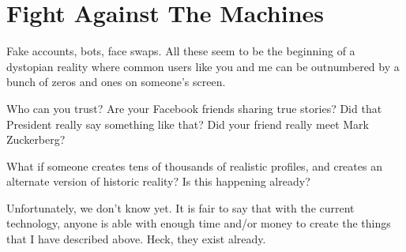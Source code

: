 \section{Fight Against The Machines}

Fake accounts, bots, face swaps. All these seem to be the beginning of a dystopian reality where common users like you and me can be outnumbered by a bunch of zeros and ones on someone's screen.

Who can you trust? Are your Facebook friends sharing true stories? Did that President really say something like that? Did your friend really meet Mark Zuckerberg?

What if someone creates tens of thousands of realistic profiles, and creates an alternate version of historic reality? Is this happening already?

Unfortunately, we don't know yet. It is fair to say that with the current technology, anyone is able with enough time and/or money to create the things that I have described above. Heck, they exist already.
